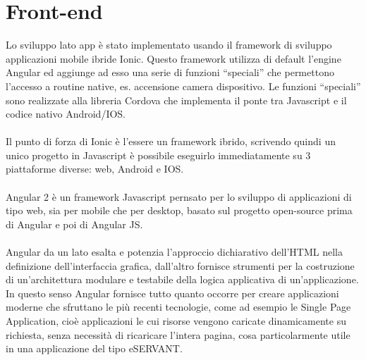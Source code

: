 \paragraph{}




\section{Front-end}


Lo sviluppo lato app è stato implementato usando il framework di sviluppo applicazioni mobile ibride Ionic.
Questo framework utilizza di default l’engine Angular ed aggiunge ad esso una serie di funzioni “speciali” che permettono l’accesso a routine native, es. accensione camera dispositivo. Le funzioni “speciali” sono realizzate alla libreria Cordova che implementa il ponte tra Javascript e il codice nativo Android/IOS.
\paragraph{}

Il punto di forza di Ionic è l’essere un framework ibrido, scrivendo quindi un unico progetto in Javascript è possibile eseguirlo immediatamente su 3 piattaforme diverse: web, Android e IOS.
\paragraph{}

Angular 2 è un framework Javascript pernsato per lo sviluppo di applicazioni di tipo web, sia per mobile che per desktop, basato sul progetto open-source prima di Angular e poi di Angular JS.
\paragraph{}

Angular da un lato esalta e potenzia l’approccio dichiarativo dell’HTML nella definizione
dell’interfaccia grafica, dall’altro fornisce strumenti per la costruzione di un’architettura modulare e testabile della logica applicativa di un’applicazione.
In questo senso Angular fornisce tutto quanto occorre per creare applicazioni moderne che
sfruttano le più recenti tecnologie, come ad esempio le Single Page Application, cioè
applicazioni le cui risorse vengono caricate dinamicamente su richiesta, senza necessità di
ricaricare l’intera pagina, cosa particolarmente utile in una applicazione del tipo eSERVANT.
\paragraph{}

